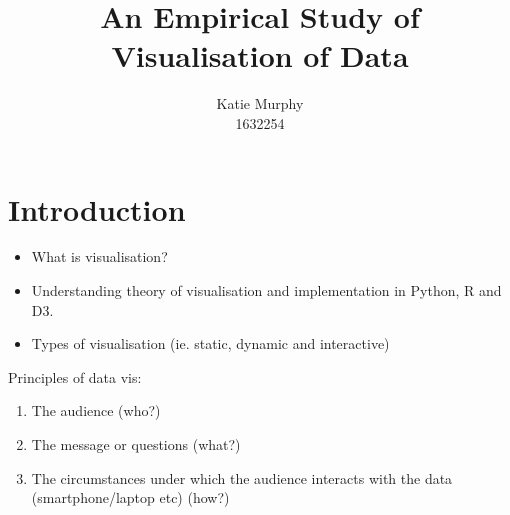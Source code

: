 \documentclass[12pt]{book}
\title{\textbf{An Empirical Study of Visualisation of Data}}
\author{Katie Murphy \\ 1632254}
\begin{document}
\maketitle


        
        
        
        
        
        
        
    
     


    \newpage


    \section{Introduction}
    
    \begin{itemize}
    \item What is visualisation?
    \item Understanding theory of visualisation and implementation in Python, R and D3.
    \item Types of visualisation (ie. static, dynamic and interactive)
    \end{itemize}
    
    Principles of data vis:
    \begin{enumerate}
        \item The audience (who?)
        \item The message or questions (what?)
        \item The circumstances under which the audience interacts with the data (smartphone/laptop etc) (how?)
    \end{enumerate}
    
\end{document}
